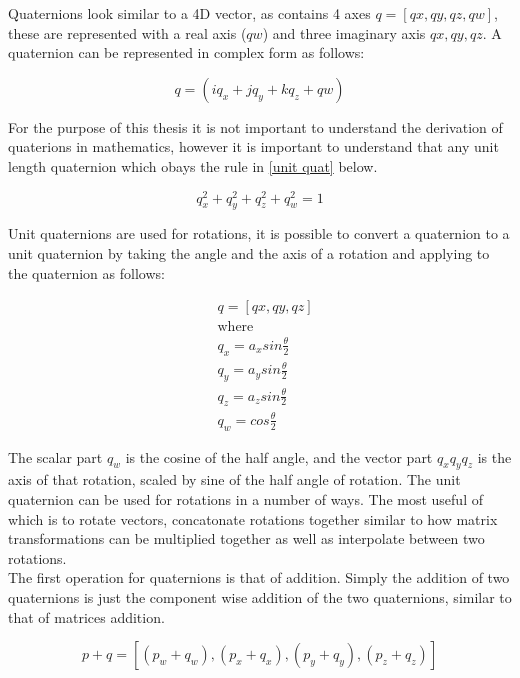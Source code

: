 Quaternions look similar to a 4D vector, as contains 4 axes $q = [qx, qy, qz, qw]$, these are represented with a real axis ($qw$) and three imaginary axis $qx, qy, qz$. A quaternion can be represented in complex form as follows: 

\begin{equation}
q = (iq_x + jq_y + kq_z + qw)
\end{equation}

For the purpose of this thesis it is not important to understand the derivation of quaterions in mathematics, however it is important to understand that any unit length quaternion which obays the rule in \ref{unit quat} below. 

\begin{equation} \label{unit quat}
	q_x^2 + q_y^2 + q_z^2 + q_w^2 = 1
\end{equation}

\noindent
Unit quaternions are used for rotations, it is possible to convert a quaternion to a unit quaternion  by taking the angle and the axis of a rotation and applying to the quaternion as follows: 

\begin{equation}
\begin{aligned}
& q = [qx, qy, qz]\\
& \text{where} \\
& q_x = a_x sin \frac{\theta}{2}\\
& q_y = a_y sin \frac{\theta}{2}\\
& q_z = a_z sin \frac{\theta}{2}\\
& q_w = cos \frac{\theta}{2}
\end{aligned}
\end{equation}

\noindent
The scalar part $q_w$ is the cosine of the half angle, and the vector part $q_x q_y q_z$ is the axis of that rotation, scaled by sine of the half angle of rotation. The unit quaternion can be used for rotations in a number of ways. The most useful of which is to rotate vectors, concatonate rotations together similar to how matrix transformations can be multiplied together as well as interpolate between two rotations. \\

The first operation for quaternions is that of addition. Simply the addition of two quaternions is just the component wise addition of the two quaternions, similar to that of matrices addition.

\begin{equation}
p + q = [(p_w + q_w), (p_x + q_x), (p_y + q_y), (p_z + q_z)]
\end{equation}

